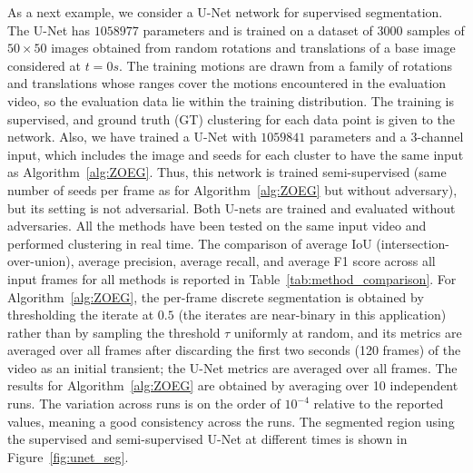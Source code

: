 \documentclass{article}
\theoremstyle{plain}
\theoremstyle{definition}
\theoremstyle{remark}
\begin{document}
As a next example, we consider %
a U-Net network for supervised segmentation. The U-Net has $1058977$ parameters and is trained on a dataset of 3000 samples of $50\times 50$ images obtained from random rotations and translations of a
base image considered at $t=0s.$ The training motions are drawn from a family of rotations and translations whose ranges cover the motions encountered in the evaluation video, so the evaluation data lie within the training distribution. The training is supervised, and ground truth (GT) clustering for each data point is given to the network. Also, we %
have trained a U-Net with $1059841$ parameters and a 3-channel input, which includes the image and seeds for each cluster to have the same input as Algorithm~\ref{alg:ZOEG}. Thus, this network is trained semi-supervised (same number of seeds per frame as for Algorithm~\ref{alg:ZOEG} but without adversary), but its setting is not adversarial. Both U-nets are trained and evaluated without adversaries.  All the methods have been tested on the same input video and performed clustering in real time. The comparison of average IoU (intersection-over-union), average precision, average recall, and average F1 score across all input frames for all methods is reported in Table~\ref{tab:method_comparison}. For Algorithm~\ref{alg:ZOEG}, the per-frame discrete segmentation is obtained by thresholding the iterate at $0.5$ (the iterates are near-binary in this application) rather than by sampling the threshold $\tau$ uniformly at random, and its metrics are averaged over all frames after discarding the first two seconds (120 frames) of the video as an initial transient; the U-Net metrics are averaged over all frames. The results for Algorithm~\ref{alg:ZOEG} are obtained by averaging over 10 independent runs. The variation across runs is on the order of $10^{-4}$ relative to the reported values, meaning a good consistency across the runs. The segmented region using the supervised and semi-supervised U-Net at different times is shown in Figure~\ref{fig:unet_seg}.
\end{document}
